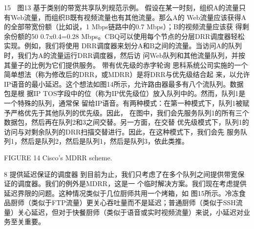                                                    15
               图13 基于类别的带宽共享队列规范示例。
假设在某一时刻，组织A的流量只有Web流量，而组织B既有视频流量也有其他流量。那么A的
Web流量应该获得A的全部带宽份额（比如说，1 Mbps链路中的0.7 Mbps）；B的视频流量应该获
得剩余份额的50%
0.7x0.4=0.28 Mbps。CBQ可以使用每个节点的分层DRR调度器轻松实现。例如，我们将使用
DRR调度器来划分A和B之间的流量。当访问A的队列时，我们为A的流量运行DRR调度器，然后访
问Web队列和其他流量队列，并按其量子的比例为它们提供服务。
带有优先级的赤字轮询
思科系统公司实施的一个简单想法（称为修改后的DRR，或MDRR）是将DRR与优先级结合起
来，以允许IP语音的最小延迟。这个想法如图14所示，允许路由器最多有八个流队列。数据包是根
据IP TOS字段中的位（称为IP优先级位）放入队列中的。然而，队列1是一个特殊的队列，通常保
留给IP语音。有两种模式：在第一种模式下，队列1被赋予严格优先于其他队列的优先级。因此，
在图中，我们会先服务队列1的所有三个数据包，然后再在队列2和3之间交替。另一方面，在交替
优先级模式下，队列1的访问与对剩余队列的DRR扫描交替进行。因此，在这种模式下，我们会先
服务队列1，然后是队列2，然后是队列1，然后是队列3，依此类推。




                FIGURE 14 Cisco’s MDRR scheme.

8 提供延迟保证的调度器
到目前为止，我们只考虑了在多个队列之间提供带宽保证的调度器。我们的例外是MDRR，这是一
个临时解决方案。我们现在考虑提供延迟界限的问题。这种情况类似于几位厨师共用一个烤箱，如
图15所示。冷冻食品厨师（类似于FTP流量）更关心吞吐量而不是延迟；普通厨师（类似于SSH流
量）关心延迟，但对于快餐厨师（类似于语音或实时视频流量）来说，小延迟对业务至关重要。


